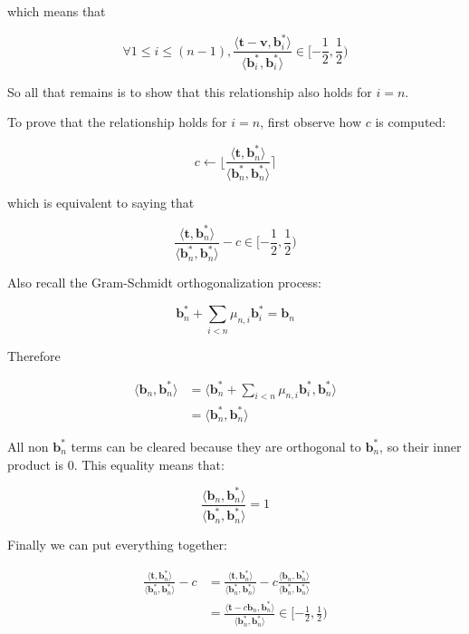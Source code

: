 \documentclass[letterpaper,12pt]{article}
\begin{document}
which means that

$$
\forall 1 \leq i \leq (n-1), 
\frac{
    \langle
        \mathbf{t} - \mathbf{v}, 
        \mathbf{b}_i^\ast
    \rangle
}{
    \langle
        \mathbf{b}_i^\ast, \mathbf{b}_i^\ast
    \rangle
} \in [-\frac{1}{2}, \frac{1}{2})
$$

So all that remains is to show that this relationship also holds for $i = n$.

To prove that the relationship holds for $i = n$, first observe how $c$ is computed:

$$
c \leftarrow \lfloor \frac{\langle\mathbf{t}, \mathbf{b}_n^\ast\rangle}{\langle\mathbf{b}_n^\ast, \mathbf{b}_n^\ast\rangle} \rceil
$$

which is equivalent to saying that

$$
\frac{
    \langle\mathbf{t}, \mathbf{b}_n^\ast\rangle
}{
    \langle\mathbf{b}_n^\ast, \mathbf{b}_n^\ast\rangle
}
- c \in [-\frac{1}{2}, \frac{1}{2})
$$

Also recall the Gram-Schmidt orthogonalization process:

$$
\mathbf{b}_n^\ast +\sum_{i<n}\mu_{n, i}\mathbf{b}_i^\ast = \mathbf{b}_n
$$

Therefore

$$
\begin{aligned}
\langle\mathbf{b}_n, \mathbf{b}_n^\ast\rangle
&= \langle 
    \mathbf{b}_n^\ast +\sum_{i<n}\mu_{n, i}\mathbf{b}_i^\ast, \mathbf{b}_n^\ast
\rangle \\
&= \langle\mathbf{b}_n^\ast, \mathbf{b}_n^\ast\rangle
\end{aligned}
$$

All non $\mathbf{b}_n^\ast$ terms can be cleared because they are orthogonal to $\mathbf{b}_n^\ast$, so their inner product is 0. This equality means that:

$$
\frac{
    \langle\mathbf{b}_n, \mathbf{b}_n^\ast\rangle
}{
    \langle\mathbf{b}_n^\ast, \mathbf{b}_n^\ast\rangle
} = 1
$$

Finally we can put everything together:

$$
\begin{aligned}
\frac{
    \langle\mathbf{t}, \mathbf{b}_n^\ast\rangle
}{
    \langle\mathbf{b}_n^\ast, \mathbf{b}_n^\ast\rangle
}
- c 
&= \frac{
    \langle\mathbf{t}, \mathbf{b}_n^\ast\rangle
}{
    \langle\mathbf{b}_n^\ast, \mathbf{b}_n^\ast\rangle
}
- c \frac{
    \langle\mathbf{b}_n, \mathbf{b}_n^\ast\rangle
}{
    \langle\mathbf{b}_n^\ast, \mathbf{b}_n^\ast\rangle
} \\
&= \frac{
    \langle\mathbf{t} - c\mathbf{b}_n, \mathbf{b}_n^\ast\rangle
}{
    \langle\mathbf{b}_n^\ast, \mathbf{b}_n^\ast\rangle
}
\in [-\frac{1}{2}, \frac{1}{2})
\end{aligned}
$$
\end{document}
